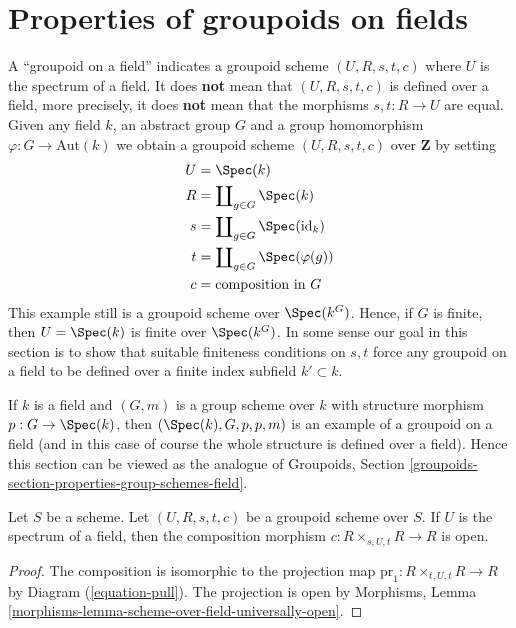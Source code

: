 \section{Properties of groupoids on fields}
\label{section-properties-groupoids-on-fields}

\noindent
A ``groupoid on a field'' indicates a groupoid scheme $(U, R, s, t, c)$
where $U$ is the spectrum of a field. It does {\bf not} mean that
$(U, R, s, t, c)$ is defined over a field, more precisely, it does
{\bf not} mean that the morphisms $s, t : R \to U$ are equal.
Given any field $k$, an abstract group $G$ and a group homomorphism
$\varphi : G \to \text{Aut}(k)$ we obtain a groupoid scheme
$(U, R, s, t, c)$ over $\mathbf{Z}$ by setting
\begin{align*}
U & = \Spec(k) \\
R & = \coprod\nolimits_{g \in G} \Spec(k) \\
s & = \coprod\nolimits_{g \in G} \Spec(\text{id}_k) \\
t & = \coprod\nolimits_{g \in G} \Spec(\varphi(g)) \\
c & = \text{composition in }G
\end{align*}
This example still is a groupoid scheme over $\Spec(k^G)$.
Hence, if $G$ is finite, then $U = \Spec(k)$ is finite over
$\Spec(k^G)$.
In some sense our goal in this section is to show that suitable
finiteness conditions on $s, t$ force any groupoid on a field
to be defined over a finite index subfield $k' \subset k$.

\medskip\noindent
If $k$ is a field and $(G, m)$ is a group scheme over $k$ with structure
morphism $p : G \to \Spec(k)$, then $(\Spec(k), G, p, p, m)$
is an example of a groupoid on a field (and in this case of course the whole
structure is defined over a field). Hence this section can be viewed as the
analogue of
Groupoids, Section \ref{groupoids-section-properties-group-schemes-field}.

\begin{lemma}
\label{lemma-groupoid-on-field-open-multiplication}
Let $S$ be a scheme. Let $(U, R, s, t, c)$ be a groupoid scheme
over $S$. If $U$ is the spectrum of a field, then the composition
morphism $c : R \times_{s, U, t} R \to R$ is open.
\end{lemma}

\begin{proof}
The composition is isomorphic to the projection map
$\text{pr}_1 : R \times_{t, U, t} R \to R$ by
Diagram (\ref{equation-pull}).
The projection is open by
Morphisms, Lemma \ref{morphisms-lemma-scheme-over-field-universally-open}.
\end{proof}

